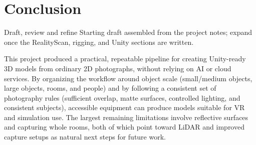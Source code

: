 \documentclass[11pt]{article}
\begin{document}
\section{Conclusion}
\begin{todobox}{Draft, review and refine}
Starting draft assembled from the project notes; expand once the RealityScan, rigging, and Unity sections are written.
\end{todobox}

\noindent This project produced a practical, repeatable pipeline for creating Unity-ready 3D models from ordinary 2D photographs, without relying on AI or cloud services. By organizing the workflow around object scale (small/medium objects, large objects, rooms, and people) and by following a consistent set of photography rules (sufficient overlap, matte surfaces, controlled lighting, and consistent subjects), accessible equipment can produce models suitable for VR and simulation use. The largest remaining limitations involve reflective surfaces and capturing whole rooms, both of which point toward LiDAR and improved capture setups as natural next steps for future work.
\end{document}
